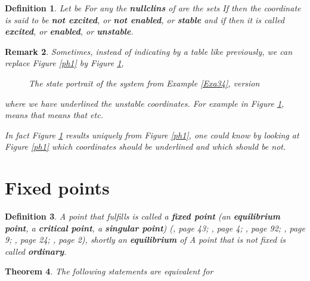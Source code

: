 \documentclass[12pt]{article}\usepackage{amsmath}
\newtheorem{theorem}{Theorem}
\newtheorem{definition}[theorem]{Definition}
\newtheorem{remark}[theorem]{Remark}
\begin{document}
\begin{definition}
Let be  For any  the \textbf{nullclins} of  are the sets
If  then the coordinate  is said to be \textbf{not
excited}, or \textbf{not enabled}, or \textbf{stable} and if  then it is called \textbf{excited}, or
\textbf{enabled}, or \textbf{unstable}.
\end{definition}

\begin{remark}
Sometimes, instead of indicating  by a table like previously, we can
replace Figure \ref{ph1} by Figure \ref{ph2},\begin{figure}
[ptb]
\begin{center}
\caption{The state portrait of the system from Example \ref{Exa34}, version}\label{ph2}\end{center}
\end{figure}
where we have underlined the unstable coordinates. For example in Figure
\ref{ph2},  means that 
 means that  etc.

In fact Figure \ref{ph2} results uniquely from Figure \ref{ph1}, one could
know by looking at Figure \ref{ph1} which coordinates should be underlined and
which should be not.
\end{remark}

\section{Fixed points}

\begin{definition}
A point  that fulfills  is called a
\textbf{fixed point} (an \textbf{equilibrium point}, a \textbf{critical
point}, a \textbf{singular point}) (\cite{bib4}, page 43; \cite{bib3}, page 4;
\cite{bib6}, page 92; \cite{bib1}, page 9; \cite{bib2}, page 24; \cite{bib5},
page 2), shortly an \textbf{equilibrium} of  A point that is not fixed
is called \textbf{ordinary}.
\end{definition}

\begin{theorem}
\label{The38}The following statements are equivalent for 

\end{theorem}
\end{document}
